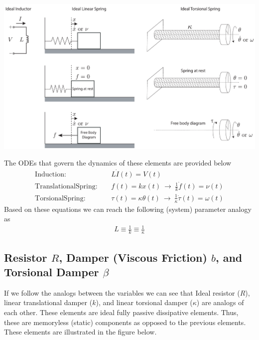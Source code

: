 \documentclass[twoside]{article}
\begin{document}
  \begin{minipage}[h]{1\linewidth}
    \begin{center}
      \includegraphics[width=1\textwidth]{ind}
    \end{center}
  \end{minipage}

The ODEs that govern the dynamics of these elements are provided below
%
\begin{align*}
\mathrm{Induction:}& \quad L \dot{I}(t) = V(t) \\
\mathrm{Translational Spring:}& \quad  f(t) = k x(t) \ \rightarrow \
                                \frac{1}{k} \dot{f}(t) = \nu(t)
\\
\mathrm{Torsional Spring:}& \quad  \tau (t) = \kappa \theta(t) \
                            \rightarrow \ \frac{1}{\kappa} \dot{\tau}(t) = \omega(t)
\end{align*}
%
Based on these equations we can reach the following (system) parameter
analogy as
%
\begin{align*}
 L \equiv \frac{1}{k} \equiv \frac{1}{\kappa}
\end{align*}
% 

\subsection{Resistor $R$, Damper (Viscous Friction) $b$, and
Torsional Damper $\beta$}

If we follow the analogs between the variables we can see that Ideal
resistor ($R$), linear translational damper ($k$), and linear
torsional damper ($\kappa$) are analogs of each other. 
These elements are ideal fully passive dissipative elements.
Thus, these are memoryless (static) components as opposed to the
previous elements. These elements are illustrated in the figure below. 
\end{document}
